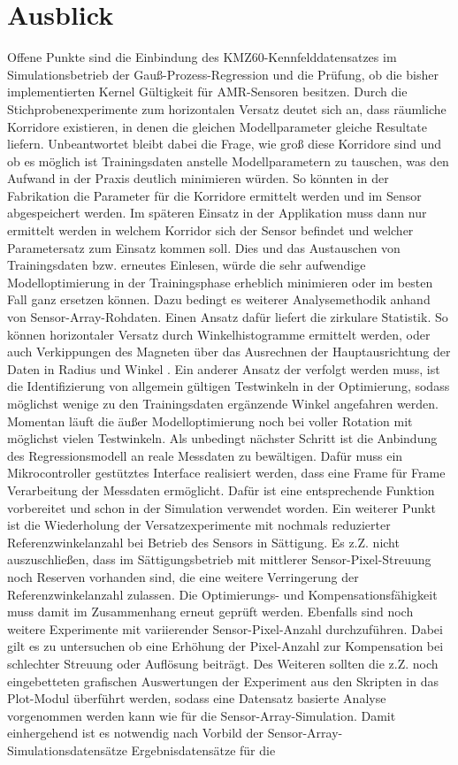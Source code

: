 \section{Ausblick}\label{sec:ausblick}


Offene Punkte sind die Einbindung des KMZ60-Kennfelddatensatzes im Simulationsbetrieb der Gauß-Prozess-Regression und die Prüfung, ob die bisher implementierten Kernel Gültigkeit für AMR-Sensoren besitzen. Durch die Stichprobenexperimente zum horizontalen Versatz deutet sich an, dass räumliche Korridore existieren, in denen die gleichen Modellparameter gleiche Resultate liefern. Unbeantwortet bleibt dabei die Frage, wie groß diese Korridore sind und ob es möglich ist Trainingsdaten anstelle Modellparametern zu tauschen, was den Aufwand in der Praxis deutlich minimieren würden. So könnten in der Fabrikation die Parameter für die Korridore ermittelt werden und im Sensor abgespeichert werden. Im späteren Einsatz in der Applikation muss dann nur ermittelt werden in welchem Korridor sich der Sensor befindet und welcher Parametersatz zum Einsatz kommen soll. Dies und das Austauschen von Trainingsdaten bzw. erneutes Einlesen, würde die sehr aufwendige Modelloptimierung in der Trainingsphase erheblich minimieren oder im besten Fall ganz ersetzen können. Dazu bedingt es weiterer Analysemethodik anhand von Sensor-Array-Rohdaten. Einen Ansatz dafür liefert die zirkulare Statistik. So können horizontaler Versatz durch Winkelhistogramme ermittelt werden, oder auch Verkippungen des Magneten über das Ausrechnen der Hauptausrichtung der Daten in Radius und Winkel \cite{Fisher1993}\cite{Mardia1999}. Ein anderer Ansatz der verfolgt werden muss, ist die Identifizierung von allgemein gültigen Testwinkeln in der Optimierung, sodass möglichst wenige zu den Trainingsdaten ergänzende Winkel angefahren werden. Momentan läuft die äußer Modelloptimierung noch bei voller Rotation mit möglichst vielen Testwinkeln. Als unbedingt nächster Schritt ist die Anbindung des Regressionsmodell an reale Messdaten zu bewältigen. Dafür muss ein Mikrocontroller gestütztes Interface realisiert werden, dass eine Frame für Frame Verarbeitung der Messdaten ermöglicht. Dafür ist eine entsprechende Funktion vorbereitet und schon in der Simulation verwendet worden. Ein weiterer Punkt ist die Wiederholung der Versatzexperimente mit nochmals reduzierter Referenzwinkelanzahl bei Betrieb des Sensors in Sättigung. Es z.Z. nicht auszuschließen, dass im Sättigungsbetrieb mit mittlerer Sensor-Pixel-Streuung noch Reserven vorhanden sind, die eine weitere Verringerung der Referenzwinkelanzahl zulassen. Die Optimierungs- und Kompensationsfähigkeit muss damit im Zusammenhang erneut geprüft werden. Ebenfalls sind noch weitere Experimente mit variierender Sensor-Pixel-Anzahl durchzuführen. Dabei gilt es zu untersuchen ob eine Erhöhung der Pixel-Anzahl zur Kompensation bei schlechter Streuung oder Auflösung beiträgt. Des Weiteren sollten die z.Z. noch eingebetteten grafischen Auswertungen der Experiment aus den Skripten in das Plot-Modul überführt werden, sodass eine Datensatz basierte Analyse vorgenommen werden kann wie für die Sensor-Array-Simulation. Damit einhergehend ist es notwendig nach Vorbild der Sensor-Array-Simulationsdatensätze Ergebnisdatensätze für die 